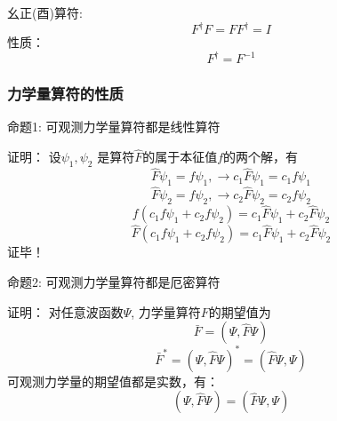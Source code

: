\begin{frame}
    \begin{definition}
        幺正(酉)算符: 
        $$ F^{\dagger}F = FF^{\dagger}=I $$
        性质：
        $$ F^{\dagger}=F^{-1}$$ 
    \end{definition}         
\end{frame} 

\begin{frame} 
    \frametitle{力学量算符的性质}
    \begin{tcolorbox1}{命题1:}
      可观测力学量算符都是线性算符  
    \end{tcolorbox1}
    \alert{证明：}
        设$\psi_1, \psi_2$ 是算符$\hat{F}$的属于本征值$f$的两个解，有\\
        $$\hat{F}\psi_1=f\psi_1, \to c_1\hat{F}\psi_1=c_1f\psi_1 $$
        $$\hat{F}\psi_2=f\psi_2, \to c_2\hat{F}\psi_2=c_2f\psi_2 $$
        $$f(c_1f\psi_1+c_2f\psi_2)=c_1\hat{F}\psi_1+c_2\hat{F}\psi_2$$
        $$\hat{F}(c_1f\psi_1+c_2f\psi_2)=c_1\hat{F}\psi_1+c_2\hat{F}\psi_2$$
    证毕！
\end{frame} 

\begin{frame} 
    \begin{tcolorbox1}{命题2:}
        可观测力学量算符都是厄密算符  
    \end{tcolorbox1}
    \alert{证明：}
        对任意波函数$\Psi$, 力学量算符$F$的期望值为\\
        $$\bar{F}=(\Psi,\hat{F} \Psi) $$
        $$\bar{F}^*=(\Psi, \hat{F} \Psi)^* = (\hat{F}\Psi, \Psi) $$
        可观测力学量的期望值都是实数，有：\\
        $$(\Psi,\hat{F}\Psi)=(\hat{F} \Psi, \Psi) $$
\end{frame} 


